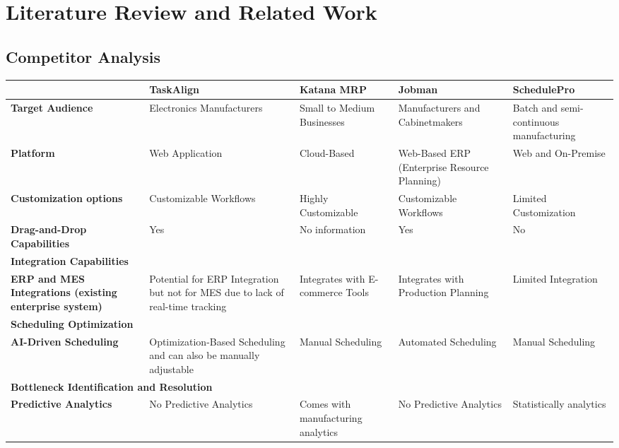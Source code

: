 \chapter{Literature Review and Related Work}
\label{chap:relatedworks}

\section{Competitor Analysis}
\label{section:competitor-analysis}

\begin{table}[!htbp]
    \begin{adjustwidth}{-.85in}{-.85in}
        \noindent
        \centering
        \small\begin{tabularx}{1.3\textwidth}{|X|>{\columncolor{yellow!20}}X|X|X|X|}
            \hline & \textbf{TaskAlign} & \textbf{Katana MRP} & \textbf{Jobman} & \textbf{SchedulePro} \\\hline
            \textbf{Target Audience} & Electronics Manufacturers & Small to Medium Businesses & Manufacturers and Cabinetmakers & Batch and semi-continuous manufacturing \\\hline
            \textbf{Platform} & Web Application & Cloud-Based & Web-Based ERP (Enterprise Resource Planning) & Web and On-Premise \\\hline
            \textbf{Customization options} & Customizable Workflows & Highly Customizable & Customizable Workflows & Limited Customization \\\hline
            \textbf{Drag-and-Drop Capabilities} & Yes & No information & Yes & No \\\hline
            \multicolumn{5}{|l|}{\textbf{Integration Capabilities}} \\\hline
            \textbf{ERP and MES Integrations (existing enterprise system)} & Potential for ERP Integration but not for MES due to lack of real-time tracking & Integrates with E-commerce Tools & Integrates with Production Planning & Limited Integration \\\hline
            \multicolumn{5}{|l|}{\textbf{Scheduling Optimization}} \\\hline
            \textbf{AI-Driven Scheduling} & Optimization-Based Scheduling and can also be manually adjustable & Manual Scheduling & Automated Scheduling & Manual Scheduling\\\hline
            \multicolumn{5}{|l|}{\textbf{Bottleneck Identification and Resolution}} \\\hline
            \textbf{Predictive Analytics} & No Predictive Analytics & Comes with manufacturing analytics & No Predictive Analytics & Statistically analytics \\\hline

\end{tabularx}
\end{adjustwidth}
\end{table}
